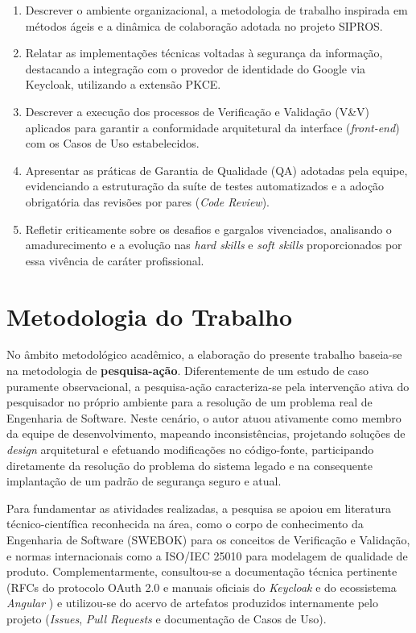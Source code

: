 \begin{enumerate}
    \item Descrever o ambiente organizacional, a metodologia de trabalho inspirada em métodos ágeis e a dinâmica de colaboração adotada no projeto SIPROS.
    \item Relatar as implementações técnicas voltadas à segurança da informação, destacando a integração com o provedor de identidade do Google via Keycloak, utilizando a extensão PKCE.
    \item Descrever a execução dos processos de Verificação e Validação (V\&V) aplicados para garantir a conformidade arquitetural da interface (\textit{front-end}) com os Casos de Uso estabelecidos.
    \item Apresentar as práticas de Garantia de Qualidade (QA) adotadas pela equipe, evidenciando a estruturação da suíte de testes automatizados e a adoção obrigatória das revisões por pares (\textit{Code Review}).
    \item Refletir criticamente sobre os desafios e gargalos vivenciados, analisando o amadurecimento e a evolução nas \textit{hard skills} e \textit{soft skills} proporcionados por essa vivência de caráter profissional.
\end{enumerate}

\section{Metodologia do Trabalho}

No âmbito metodológico acadêmico, a elaboração do presente trabalho baseia-se na metodologia de \textbf{pesquisa-ação}. Diferentemente de um estudo de caso puramente observacional, a pesquisa-ação caracteriza-se pela intervenção ativa do pesquisador no próprio ambiente para a resolução de um problema real de Engenharia de Software. Neste cenário, o autor atuou ativamente como membro da equipe de desenvolvimento, mapeando inconsistências, projetando soluções de \textit{design} arquitetural e efetuando modificações no código-fonte, participando diretamente da resolução do problema do sistema legado e na consequente implantação de um padrão de segurança seguro e atual.

Para fundamentar as atividades realizadas, a pesquisa se apoiou em literatura técnico-científica reconhecida na área, como o corpo de conhecimento da Engenharia de Software (SWEBOK) \cite{swebok_v3} para os conceitos de Verificação e Validação, e normas internacionais como a ISO/IEC 25010 \cite{iso25010} para modelagem de qualidade de produto. Complementarmente, consultou-se a documentação técnica pertinente (RFCs do protocolo OAuth 2.0 \cite{rfc6749, rfc7636} e manuais oficiais do \textit{Keycloak} \cite{keycloak_docs} e do ecossistema \textit{Angular} \cite{angular_docs}) e utilizou-se do acervo de artefatos produzidos internamente pelo projeto (\textit{Issues}, \textit{Pull Requests} e documentação de Casos de Uso). 

